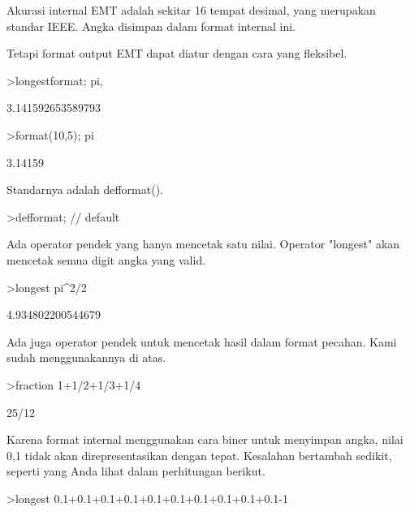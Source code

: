 \documentclass[a4paper,10pt]{article}
\begin{document}
\begin{eulernotebook}
\begin{eulercomment}
Akurasi internal EMT adalah sekitar 16 tempat desimal, yang merupakan
standar IEEE. Angka disimpan dalam format internal ini.

Tetapi format output EMT dapat diatur dengan cara yang fleksibel.
\end{eulercomment}
\begin{eulerprompt}
>longestformat; pi,
\end{eulerprompt}
\begin{euleroutput}
  3.141592653589793
\end{euleroutput}
\begin{eulerprompt}
>format(10,5); pi
\end{eulerprompt}
\begin{euleroutput}
    3.14159 
\end{euleroutput}
\begin{eulercomment}
Standarnya adalah defformat().
\end{eulercomment}
\begin{eulerprompt}
>defformat; // default
\end{eulerprompt}
\begin{eulercomment}
Ada operator pendek yang hanya mencetak satu nilai. Operator "longest"
akan mencetak semua digit angka yang valid.
\end{eulercomment}
\begin{eulerprompt}
>longest pi^2/2
\end{eulerprompt}
\begin{euleroutput}
        4.934802200544679 
\end{euleroutput}
\begin{eulercomment}
Ada juga operator pendek untuk mencetak hasil dalam format pecahan.
Kami sudah menggunakannya di atas.
\end{eulercomment}
\begin{eulerprompt}
>fraction 1+1/2+1/3+1/4
\end{eulerprompt}
\begin{euleroutput}
  25/12
\end{euleroutput}
\begin{eulercomment}
Karena format internal menggunakan cara biner untuk menyimpan angka,
nilai 0,1 tidak akan direpresentasikan dengan tepat. Kesalahan
bertambah sedikit, seperti yang Anda lihat dalam perhitungan berikut.
\end{eulercomment}
\begin{eulerprompt}
>longest 0.1+0.1+0.1+0.1+0.1+0.1+0.1+0.1+0.1+0.1-1
\end{eulerprompt}

\end{eulernotebook}
\end{document}
